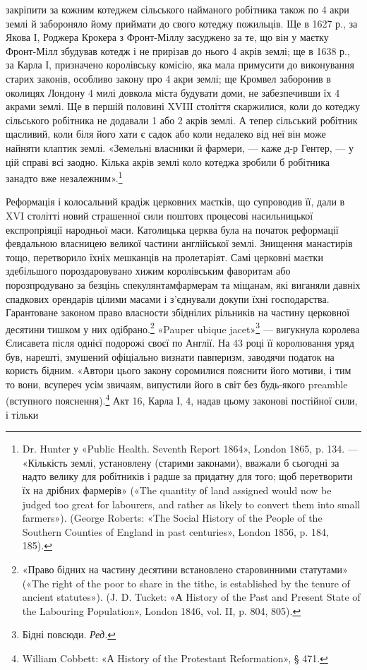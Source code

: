 закріпити за кожним котеджем сільського найманого робітника
також по 4 акри землі й забороняло йому приймати до свого
котеджу пожильців. Ще в 1627 р., за Якова І, Роджера Крокера
з Фронт-Міллу засуджено за те, що він у маєтку Фронт-Мілл
збудував котедж і не прирізав до нього 4 акрів землі; ще в 1638 р.,
за Карла І, призначено королівську комісію, яка мала примусити
до виконування старих законів, особливо закону про 4 акри
землі; ще Кромвел заборонив в околицях Лондону 4 милі довкола
міста будувати доми, не забезпечивши їх 4 акрами землі. Ще в
першій половині XVIIІ століття скаржилися, коли до котеджу
сільського робітника не додавали 1 або 2 акрів землі. А тепер
сільський робітник щасливий, коли біля його хати є садок або
коли недалеко від неї він може найняти клаптик землі. «Земельні
власники й фармери, — каже д-р Гентер, — у цій справі всі заодно.
Кілька акрів землі коло котеджа зробили б робітника
занадто вже незалежним».\footnote{
Dr. Hunter у «Public Health. Seventh Report 1864», London 1865,
p. 134. — «Кількість землі, установлену (старими законами), вважали б
сьогодні за надто велику для робітників і радше за придатну для того;
щоб перетворити їх на дрібних фармерів» («The quantity оf land assigned
would now be judged too great for labourers, and rather as likely to
convert them into small farmers»). (George Roberts: «The Social History
of the People of the Southern Counties of England in past centuries», London
1856, p. 184, 185).
}

Реформація і колосальний крадіж церковних маєтків, що
супроводив її, дали в XVI столітті новий страшенної сили поштовх
процесові насильницької експропріяції народньої маси.
Католицька церква була на початок реформації февдальною
власницею великої частини англійської землі. Знищення манастирів
тощо, перетворило їхніх мешканців на пролетаріят.
Самі церковні маєтки здебільшого пороздаровувано хижим королівським
фаворитам або порозпродувано за безцінь спекулянтамфармерам
та міщанам, які виганяли давніх спадкових орендарів
цілими масами і з’єднували докупи їхні господарства. Гарантоване
законом право власности збіднілих рільників на частину
церковної десятини тишком у них одібрано.\footnote{
«Право бідних на частину десятини встановлено старовинними
статутами» («The right of the poor to share in the tithe, is established by
the tenure of ancient statutes»). (J. D. Tucket: «А History of the Past
and Present State of the Labouring Population», London 1846, vol. II,
p. 804, 805).
} «Pauper ubique
jacet»\footnote*{
Бідні повсюди. \emph{Ред.}
} — вигукнула королева Єлисавета після однієї подорожі
своєї по Англії. На 43 році її королювання уряд був, нарешті,
змушений офіціально визнати павперизм, заводячи податок на
користь бідним. «Автори цього закону соромилися пояснити
його мотиви, і тим то вони, всупереч усім звичаям, випустили
його в світ без будь-якого preamble (вступного пояснення).\footnote{
William Cobbett: «А History of the Protestant Reformation», § 471.
}
Акт 16, Карла І, 4, надав цьому законові постійної сили, і тільки
